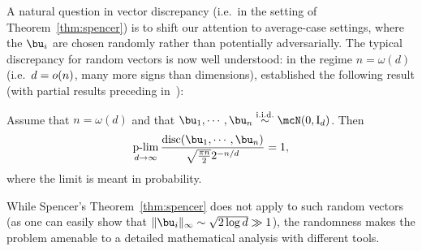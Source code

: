 \noindent
A natural question in vector discrepancy (i.e.\ in the setting of Theorem~\ref{thm:spencer}) is to shift our attention to average-case settings, where the $\bu_i$ are 
chosen randomly rather than potentially adversarially.
The typical discrepancy for random vectors is now well understood: in the regime $n = \omega(d)$ (i.e.\ $d = o(n)$, many more signs than dimensions), 
\cite{turner2020balancing} established the following result (with partial results preceding in~\cite{karmarkar1986probabilistic,costello2009balancing}):
\begin{theorem}\label{thm:rvector_disc}
    Assume that $n = \omega(d)$ and that $\bu_1, \cdots, \bu_n \iid \mcN(0, \Id_d)$.
    Then  
    \begin{align*}
        \plim_{d \to \infty} \frac{\disc(\bu_1, \cdots, \bu_n)}{\sqrt{\frac{\pi n}{2}} 2^{-n/d}} = 1,
    \end{align*}
    where the limit is meant in probability.
\end{theorem}
\noindent
While Spencer's Theorem~\ref{thm:spencer} does not apply to such random vectors (as one can easily show that $\|\bu_i\|_\infty \sim \sqrt{2 \log d} \gg 1$),
the randomness makes the problem amenable to a detailed mathematical analysis with different tools.

